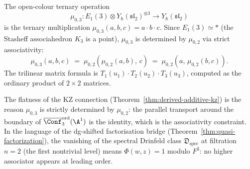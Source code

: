 \begin{computation}
\label{comp:mu03-ternary}
The open-colour ternary operation
\[
\mu_{0,3} \colon E_1(3) \otimes
Y_\hbar(\mathfrak{sl}_2)^{\otimes 3} \to
Y_\hbar(\mathfrak{sl}_2)
\]
is the ternary multiplication
$\mu_{0,3}(a, b, c) = a \cdot b \cdot c$.
Since $E_1(3) \simeq *$ (the Stasheff associahedron $K_3$ is
a point), $\mu_{0,3}$ is determined by $\mu_{0,2}$ via strict
associativity:
\[
\mu_{0,3}(a, b, c)
\;=\;
\mu_{0,2}(\mu_{0,2}(a, b),\, c)
\;=\;
\mu_{0,2}(a,\, \mu_{0,2}(b, c)).
\]
The trilinear matrix formula is
$T_1(u_1) \cdot T_2(u_2) \cdot T_3(u_3)$, computed as the
ordinary product of $2 \times 2$ matrices.

The flatness of the KZ connection
(Theorem~\ref{thm:derived-additive-kz}) is the reason
$\mu_{0,3}$ is strictly determined by $\mu_{0,2}$: the
parallel transport around the boundary of
$\overline{\Conf}_3^{\mathrm{ord}}(\A^1)$ is the identity,
which is the associativity constraint. In the language of
the dg-shifted factorisation bridge
(Theorem~\ref{thm:quasi-factorization}), the vanishing
of the spectral Drinfeld class $\mathfrak{D}_{\mathrm{spec}}$
at filtration $n = 2$ (the first nontrivial level) means
$\Phi(w, z) = 1$ modulo $F^3$: no higher associator appears
at leading order.
\end{computation}

